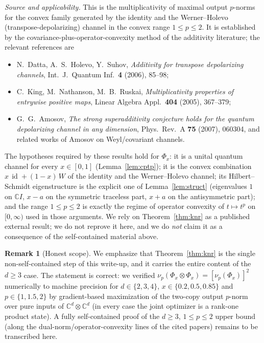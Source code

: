 \documentclass{amsart}
\theoremstyle{definition}
\newtheorem{remark}{Remark}
\DeclareMathOperator{\id}{id}
\begin{document}
\noindent\emph{Source and applicability.}
This is the multiplicativity of maximal output $p$-norms for the convex family
generated by the identity and the Werner--Holevo (transpose-depolarizing)
channel in the convex range $1\le p\le 2$. It is established by the
covariance-plus-operator-convexity method of the additivity literature; the
relevant references are
\begin{itemize}
\item N.~Datta, A.~S.~Holevo, Y.~Suhov,
  \emph{Additivity for transpose depolarizing channels},
  Int.~J.~Quantum Inf.\ \textbf{4} (2006), 85--98;
\item C.~King, M.~Nathanson, M.~B.~Ruskai,
  \emph{Multiplicativity properties of entrywise positive maps},
  Linear Algebra Appl.\ \textbf{404} (2005), 367--379;
\item G.~G.~Amosov,
  \emph{The strong superadditivity conjecture holds for the quantum
  depolarizing channel in any dimension},
  Phys.~Rev.~A \textbf{75} (2007), 060304, and related works of Amosov on
  Weyl/covariant channels.
\end{itemize}
The hypotheses required by these results hold for $\Phi_x$: it is a unital
quantum channel for every $x\in[0,1]$ (Lemma~\ref{lem:cptp}); it is the convex
combination $x\,\id+(1-x)\,W$ of the identity and the Werner--Holevo channel;
its Hilbert--Schmidt eigenstructure is the explicit one of
Lemma~\ref{lem:struct} (eigenvalues $1$ on $\mathbb C I$, $x-a$ on the
symmetric traceless part, $x+a$ on the antisymmetric part); and the range
$1\le p\le 2$ is exactly the regime of operator convexity of $t\mapsto t^{p}$ on
$[0,\infty)$ used in those arguments. We rely on
Theorem~\ref{thm:knr} as a published external result; we do not reprove it here,
and we do \emph{not} claim it as a consequence of the self-contained material
above.

\begin{remark}[Honest scope]
We emphasize that Theorem~\ref{thm:knr} is the single non-self-contained step of
this write-up, and it carries the entire content of the $d\ge3$ case. The
statement is correct: we verified $\nu_p(\Phi_x\otimes\Phi_x)
=[\nu_p(\Phi_x)]^{2}$ numerically to machine precision for
$d\in\{2,3,4\}$, $x\in\{0.2,0.5,0.85\}$ and $p\in\{1,1.5,2\}$ by gradient-based
maximization of the two-copy output $p$-norm over pure inputs of $\mathbb
C^{d}\otimes\mathbb C^{d}$ (in every case the joint optimizer is a rank-one
product state). A fully self-contained proof of the $d\ge3$, $1\le p\le2$ upper
bound (along the dual-norm/operator-convexity lines of the cited papers) remains
to be transcribed here.
\end{remark}
\end{document}
